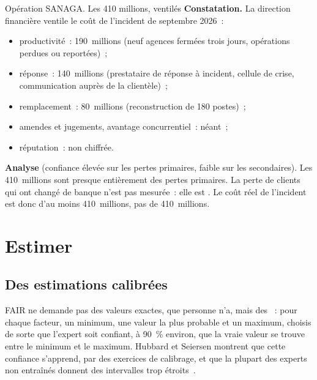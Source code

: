 \begin{boxscenario}{Opération SANAGA. Les 410 millions, ventilés}
\textbf{Constatation.} La direction financière ventile le coût de
l'incident de septembre 2026~:
\begin{itemize}
    \item productivité~: 190~millions (neuf agences fermées trois jours,
          opérations perdues ou reportées)~;
    \item réponse~: 140~millions (prestataire de réponse à incident,
          cellule de crise, communication auprès de la clientèle)~;
    \item remplacement~: 80~millions (reconstruction de 180 postes)~;
    \item amendes et jugements, avantage concurrentiel~: néant~;
    \item réputation~: non chiffrée.
\end{itemize}

\textbf{Analyse} (confiance élevée sur les pertes primaires, faible sur
les secondaires). Les 410~millions sont presque entièrement des pertes
primaires. La perte de clients qui ont changé de banque n'est pas mesurée~:
elle est \NEK{}. Le coût réel de l'incident est donc d'au moins
410~millions, pas de 410~millions.
\end{boxscenario}

\section{Estimer}
\label{sec:c05-estimer}

\subsection{Des estimations calibrées}

FAIR ne demande pas des valeurs exactes, que personne n'a, mais des
~: pour chaque
facteur, un minimum, une valeur la plus probable et un maximum, choisis de
sorte que l'expert soit confiant, à 90~\% environ, que la vraie valeur se
trouve entre le minimum et le maximum. Hubbard et Seiersen montrent que
cette confiance s'apprend, par des exercices de calibrage, et que la
plupart des experts non entraînés donnent des intervalles trop
étroits~\cite{hubbard2016measure}.

